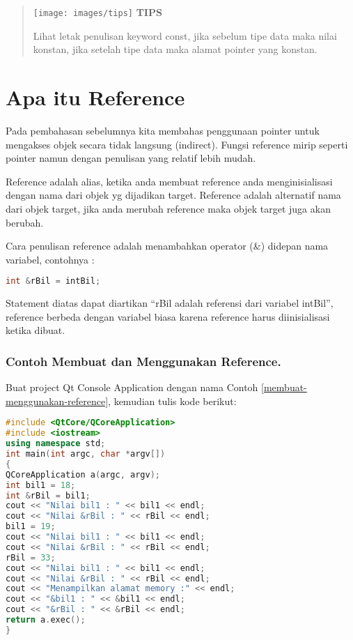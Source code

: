 \begin{quotation}
\texttt{[image: images/tips]}	\textbf{TIPS}
	
	Lihat
	letak penulisan keyword const, jika sebelum tipe data maka nilai
	konstan, jika setelah tipe data maka alamat pointer yang konstan.
\end{quotation}
 

\section{Apa itu Reference}\label{apa-itu-reference}

Pada pembahasan sebelumnya kita membahas penggunaan pointer untuk
mengakses objek secara tidak langsung (indirect). Fungsi reference mirip
seperti pointer namun dengan penulisan yang relatif lebih mudah.

Reference adalah alias, ketika anda membuat reference anda
menginisialisasi dengan nama dari objek yg dijadikan target. Reference
adalah alternatif nama dari objek target, jika anda merubah reference
maka objek target juga akan berubah.

Cara penulisan reference adalah menambahkan operator (\&) didepan nama
variabel, contohnya :

\begin{lstlisting}[language=c++, numbers=none]
int &rBil = intBil;
\end{lstlisting}

Statement diatas dapat diartikan ``rBil adalah referensi dari variabel
intBil'', reference berbeda dengan variabel biasa karena reference harus
diinisialisasi ketika dibuat.

\subsubsection*{Contoh  Membuat dan Menggunakan Reference.}

Buat project Qt Console Application dengan nama Contoh \ref{membuat-menggunakan-reference}, kemudian tulis
kode berikut:

\begin{lstlisting}[language=c++, caption=Membuat dan Menggunakan Reference, label=membuat-menggunakan-reference]
#include <QtCore/QCoreApplication>
#include <iostream>
using namespace std;
int main(int argc, char *argv[])
{
QCoreApplication a(argc, argv);
int bil1 = 18;
int &rBil = bil1;
cout << "Nilai bil1 : " << bil1 << endl;
cout << "Nilai &rBil : " << rBil << endl;
bil1 = 19;
cout << "Nilai bil1 : " << bil1 << endl;
cout << "Nilai &rBil : " << rBil << endl;
rBil = 33;
cout << "Nilai bil1 : " << bil1 << endl;
cout << "Nilai &rBil : " << rBil << endl;
cout << "Menampilkan alamat memory :" << endl;
cout << "&bil1 : " << &bil1 << endl;
cout << "&rBil : " << &rBil << endl;
return a.exec();
}
\end{lstlisting}

